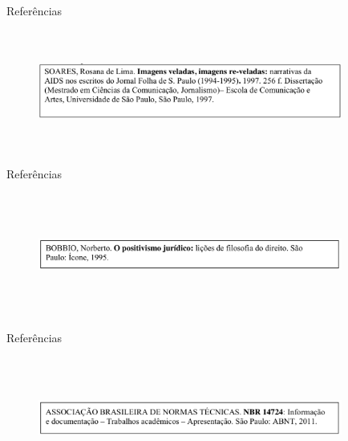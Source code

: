 \begin{frame}	
	\begin{block}{Referências}	
		 \begin{figure}[!htb]
			\centering	  				
			\includegraphics[height=4cm, width = 10cm]{./pic/referencias/dissertacoesteses.png}
			\author{Guia de formatação SENAC }
			\label{fig_referencia03}
		\end{figure}
	\end{block}
\end{frame}

\begin{frame}	
	\begin{block}{Referências}	
		 \begin{figure}[!htb]
			\centering	  				
			\includegraphics[height=4cm, width = 10cm]{./pic/referencias/livroimpresso.png}
			\author{Guia de formatação SENAC }
			\label{fig_referencia04}
		\end{figure}
	\end{block}
\end{frame}

\begin{frame}	
	\begin{block}{Referências}	
		 \begin{figure}[!htb]
			\centering	  				
			\includegraphics[height=4cm, width = 10cm]{./pic/referencias/normastecnicas.png}
			\author{Guia de formatação SENAC }
			\label{fig_referencia05}
		\end{figure}
	\end{block}
\end{frame}

